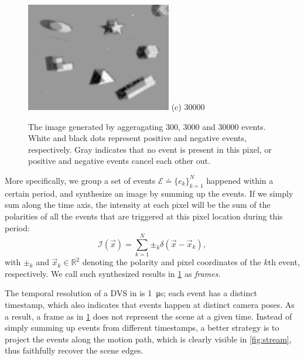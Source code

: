 \begin{figure}[h]
\begin{minipage}[t]{0.3\textwidth}
    \centering \includegraphics[width = \textwidth]{images/30000.jpg}
    (c) \num{30000}
  \end{minipage}
  \caption{The image generated by aggeragating \num{300}, \num{3000}
    and \num{30000} events. White and black dots represent positive
    and negative events, respectively. Gray indicates that no event is
    present in this pixel, or positive and negative events cancel each
    other out.}
  \label{fig:window_size_3}
\end{figure}
More specifically, we group a set of events
$\mathscr{E}\doteq \{e_k\}_{k=1}^N$ happened within a certain period,
and synthesize an image by summing up the events. If we simply sum
along the time axis, the intensity at each pixel will be the sum of
the polarities of all the events that are triggered at this pixel
location during this period:
\begin{equation}
  \label{eq:intensity}
  \mathcal{I}(\vec{x}) = \sum_{k=1}^N\pm_k\delta(\vec{x}-\vec{x}_k),
\end{equation}
with $\pm_k$ and $\vec{x}_k\in\mathbb{R}^2$ denoting the polarity and pixel
coordinates of the $k$th event, respectively. We call such synthesized
results in \cref{fig:window_size_3} as \emph{frames}.

The temporal resolution of a DVS in \citep{brandli2014240} is
\SI{1}{\micro s}; each event has a distinct timestamp, which also
indicates that events happen at distinct camera poses. As a result, a
frame as in \cref{fig:window_size_3} does not represent the scene at a
given time. Instead of simply summing up events from different
timestamps, a better strategy is to project the events along the
motion path, which is clearly visible in \cref{fig:stream}, thus
faithfully recover the scene edges.

